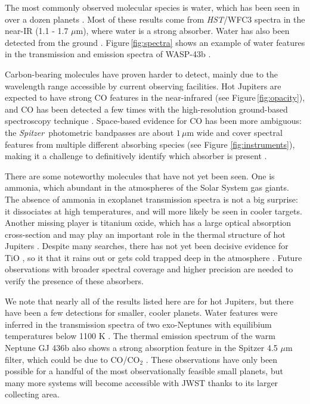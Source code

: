 \documentclass[graybox,natbib,nosecnum]{svmult}
\newcommand{\project}[1]{\textsl{#1}}
\newcommand{\HST}{\project{HST}}
\newcommand{\Spitzer}{\project{Spitzer}}
\begin{document}
The most commonly observed molecular species is water, which has been seen in over a dozen planets \citep[e.g.][]{deming13, huitson13, mccullough14, fraine14, kreidberg14b, kreidberg15b, line16, evans16}. Most of these results come from \HST/WFC3 spectra in the near-IR (1.1 - 1.7 $\mu$m), where water is a strong absorber. Water has also been detected from the ground \citep{birkby13, stevenson16b}.  Figure\,\ref{fig:spectra} shows an example of water features in the transmission and emission spectra of WASP-43b \citep{kreidberg14b}. 

Carbon-bearing molecules have proven harder to detect, mainly due to the wavelength range accessible by current observing facilities. Hot Jupiters are expected to have strong CO features in the near-infrared (see Figure\,\ref{fig:opacity}), and CO has been detected a few times with the high-resolution ground-based spectroscopy technique \citep{dekok13,brogi14}.  Space-based evidence for CO has been more ambiguous: the \Spitzer\ photometric bandpasses are about $1\,\mu$m wide and cover spectral features from multiple different absorbing species (see Figure \ref{fig:instruments}), making it a challenge to definitively identify which absorber is present \citep[e.g.][]{desert09, stevenson10, madhusudhan11, morley17}.  

There are some noteworthy molecules that have not yet been seen. One is ammonia, which abundant in the atmospheres of the Solar System gas giants. The absence of ammonia in exoplanet transmission spectra is not a big surprise: it dissociates at high temperatures, and will more likely be seen in cooler targets.  Another missing player is titanium oxide, which has a large optical absorption cross-section and may play an important role in the thermal structure of hot Jupiters \citep{fortney08}. Despite many searches, there has not yet been decisive evidence for TiO \citep[e.g.,]{sing13, evans16}, so it that it rains out or gets cold trapped deep in the atmosphere \citep{parmentier13}.
 Future observations with broader spectral coverage and higher precision are needed to verify the presence of these absorbers.

We note that nearly all of the results listed here are for hot Jupiters, but there have been a few detections for smaller, cooler planets. Water features were inferred in the transmission spectra of two exo-Neptunes with equilibium temperatures below 1100 K \citep{fraine14, wakeford17}. The thermal emission spectrum of the warm Neptune GJ 436b also shows a strong absorption feature in the Spitzer 4.5 $\mu$m filter, which could be due to CO/CO$_2$ \citep{morley17}.  These observations have only been possible for a handful of the most observationally feasible small planets, but many more systems will become accessible with JWST thanks to its larger collecting area. 
\end{document}
